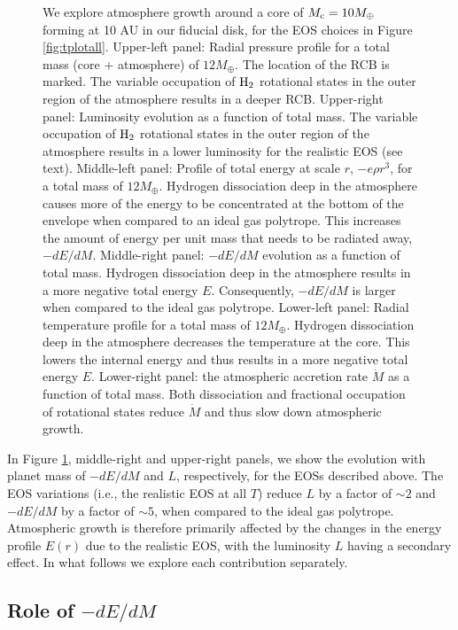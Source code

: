 \documentclass[apj]{emulateapj}
\newcommand{\co}{_{\rm c}}
\begin{document}
\begin{figure}[tb]
{We explore atmosphere growth around a core of $M\co=10 M_{\oplus}$ forming at 10 AU in our fiducial disk, for the EOS choices in Figure \ref{fig:tplotall}.  Upper-left panel: Radial pressure profile for a total mass (core + atmosphere) of $12 M_{\oplus}$. The location of the RCB is marked. The variable occupation of $\rm H_2$ rotational states in the outer region of the atmosphere results in a deeper RCB. Upper-right panel:  Luminosity evolution as a function of total mass. The variable occupation of $\rm H_2$ rotational states in the outer region of the atmosphere results in a lower luminosity for the realistic EOS (see text). Middle-left panel: Profile of total energy at scale $r$, $-e \rho r^3$, for a total mass of $12 M_{\oplus}$. Hydrogen dissociation deep in the atmosphere causes more of the energy to be concentrated at the bottom of the envelope when compared to an ideal gas polytrope. This increases the amount of energy per unit mass that needs to be radiated away, $-dE/dM$.  Middle-right panel:  $-dE/dM$ evolution as a function of total mass. Hydrogen dissociation deep in the atmosphere results in a more negative total energy $E$. Consequently, $-dE/dM$ is larger when compared to the ideal gas polytrope. Lower-left panel:  Radial temperature profile for a total mass of $12 M_{\oplus}$.  Hydrogen dissociation deep in the atmosphere decreases the temperature at the core. This lowers the internal energy and thus results in a more negative total energy $E$.   Lower-right panel: the atmospheric accretion rate $\dot{M}$ as a function of total mass. Both dissociation and fractional occupation of rotational states reduce $\dot{M}$ and thus slow down atmospheric growth.}
\label{fig:all_plot}
\end{figure}

In Figure \ref{fig:all_plot}, middle-right and upper-right panels, we show the evolution with planet mass of $-dE/dM$ and $L$, respectively, for the EOSs described above. The EOS variations (i.e., the realistic EOS at all $T$) reduce $L$ by a factor of $\sim$$2$ and $-dE/dM$ by a factor of $\sim$$5$, when compared to the ideal gas polytrope. Atmospheric growth is therefore primarily affected by the changes in the energy profile $E(r)$ due to the realistic EOS, with the luminosity $L$ having a secondary effect. In what follows we explore each contribution separately. 


\subsection{Role of $-dE/dM$}
\end{document}
